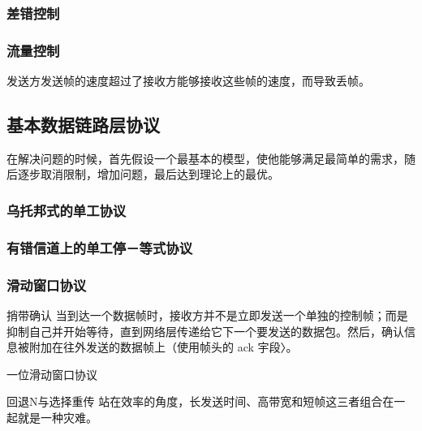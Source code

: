     \subsubsection{差错控制}
    \subsubsection{流量控制}
    发送方发送帧的速度超过了接收方能够接收这些帧的速度，而导致丢帧。

    \subsection{基本数据链路层协议}
    在解决问题的时候，首先假设一个最基本的模型，使他能够满足最简单的需求，随后逐步取消限制，增加问题，最后达到理论上的最优。

    \subsubsection{乌托邦式的单工协议}
    \subsubsection{有错信道上的单工停－等式协议}
    \subsubsection{滑动窗口协议}
    \begin{parabox}{捎带确认}
        当到达一个数据帧时，接收方并不是立即发送一个单独的控制帧；而是抑制自己并开始等待，直到网络层传递给它下一个要发送的数据包。然后，确认信息被附加在往外发送的数据帧上（使用帧头的 ack 宇段〉。      
    \end{parabox}
    \begin{parabox}{一位滑动窗口协议}
        
    \end{parabox}
    
    \begin{parabox}{回退N与选择重传}
        站在效率的角度，长发送时间、高带宽和短帧这三者组合在一起就是一种灾难。 
        

    \end{parabox}